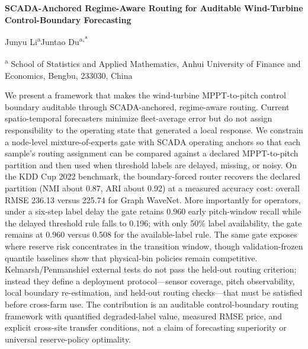 \documentclass[
  11pt]{article}
\author{}
\date{}
\begin{document}
\begin{center}
\begin{minipage}{0.94\textwidth}
\centering
\Large\bfseries SCADA-Anchored Regime-Aware Routing for Auditable Wind-Turbine Control-Boundary Forecasting\par
\vspace{0.6em}
\normalsize Junyu Li\textsuperscript{a}\qquad Juntao Du\textsuperscript{a,*}\par
\vspace{0.35em}
\small \textsuperscript{a} School of Statistics and Applied Mathematics, Anhui University of Finance and Economics, Bengbu, 233030, China\par
\end{minipage}
\end{center}

\vspace{0.05em}


\vspace{0.35em}

 \vspace{0.18em} \small We
present a framework that makes the wind-turbine MPPT-to-pitch control
boundary auditable through SCADA-anchored, regime-aware routing. Current
spatio-temporal forecasters minimize fleet-average error but do not
assign responsibility to the operating state that generated a local
response. We constrain a node-level mixture-of-experts gate with SCADA
operating anchors so that each sample's routing assignment can be
compared against a declared MPPT-to-pitch partition and then used when
threshold labels are delayed, missing, or noisy. On the KDD Cup 2022
benchmark, the boundary-forced router recovers the declared partition
(NMI about 0.87, ARI about 0.92) at a measured accuracy cost: overall
RMSE 236.13 versus 225.74 for Graph WaveNet. More importantly for
operators, under a six-step label delay the gate retains 0.960 early
pitch-window recall while the delayed threshold rule falls to 0.196;
with only 50\% label availability, the gate remains at 0.960 versus
0.508 for the available-label rule. The same gate exposes where reserve
risk concentrates in the transition window, though validation-frozen
quantile baselines show that physical-bin policies remain competitive.
Kelmarsh/Penmanshiel external tests do not pass the held-out routing
criterion; instead they define a deployment protocol---sensor coverage,
pitch observability, local boundary re-estimation, and held-out routing
checks---that must be satisfied before cross-farm use. The contribution
is an auditable control-boundary routing framework with quantified
degraded-label value, measured RMSE price, and explicit cross-site
transfer conditions, not a claim of forecasting superiority or universal
reserve-policy optimality.
\end{document}
